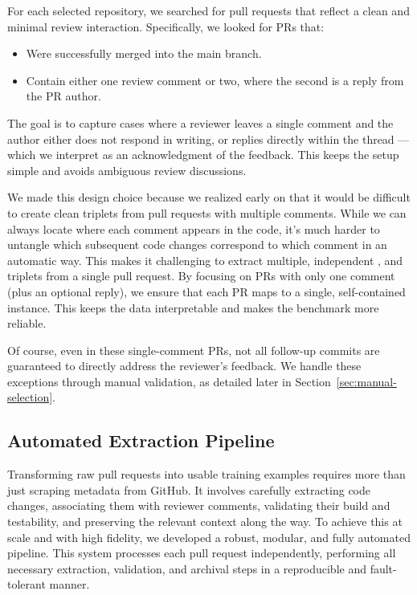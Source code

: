 For each selected repository, we searched for pull requests that reflect a clean and minimal review
interaction. Specifically, we looked for PRs that:

\begin{itemize}
	\item Were successfully merged into the main branch.
	\item Contain either one review comment or two, where the second is a reply from the PR author.
\end{itemize}

The goal is to capture cases where a reviewer leaves a single comment and the author either does not
respond in writing, or replies directly within the thread — which we interpret as an acknowledgment
of the feedback. This keeps the setup simple and avoids ambiguous review discussions.

We made this design choice because we realized early on that it would be difficult to create clean
triplets from pull requests with multiple comments. While we can always locate where each comment
appears in the code, it's much harder to untangle which subsequent code changes correspond to which
comment in an automatic way. This makes it challenging to extract multiple, independent \subCode,
\revComment and \revCode triplets from a single pull request. By focusing on PRs with only one
comment (plus an optional reply), we ensure that each PR maps to a single, self-contained instance.
This keeps the data interpretable and makes the benchmark more reliable.

Of course, even in these single-comment PRs, not all follow-up commits are guaranteed to directly
address the reviewer’s feedback. We handle these exceptions through manual validation, as detailed
later in Section~\ref{sec:manual-selection}.

\subsection{Automated Extraction Pipeline}
\label{sec:pipeline}
Transforming raw pull requests into usable training examples requires more than just scraping
metadata from GitHub. It involves carefully extracting code changes, associating them with reviewer
comments, validating their build and testability, and preserving the relevant context along the way.
To achieve this at scale and with high fidelity, we developed a robust, modular, and fully automated
pipeline. This system processes each pull request independently, performing all necessary
extraction, validation, and archival steps in a reproducible and fault-tolerant manner.

